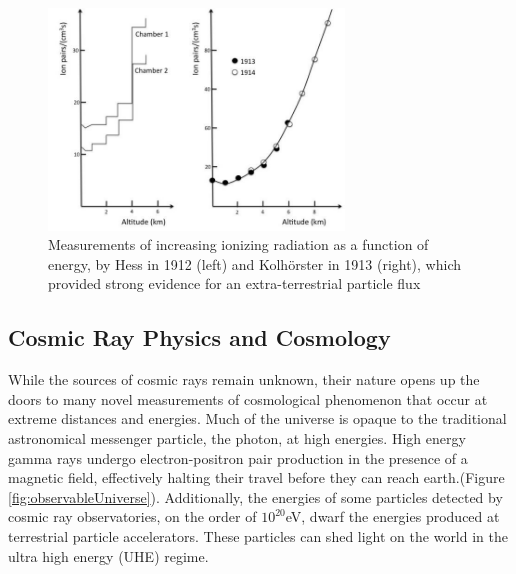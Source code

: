 \begin{figure}
\centering
	\includegraphics[width=0.7\textwidth]{figures/HessKol}
	\caption{Measurements of increasing ionizing radiation as a function of energy, by Hess in 1912 (left) and Kolhörster in 1913 (right), which provided strong evidence for an extra-terrestrial particle flux
	\cite{HessKolPic} }
\label{fig:HessKol}
\end{figure}
	
	\subsection{Cosmic Ray Physics and Cosmology}
	While the sources of cosmic rays remain unknown, their nature opens up the doors to many novel measurements of cosmological phenomenon that occur at extreme distances and energies.  Much of the universe is opaque to the traditional astronomical messenger particle, the photon, at high energies.  High energy gamma rays undergo electron-positron pair production in the presence of a magnetic field, effectively halting their travel before they can reach earth.(Figure \ref{fig:observableUniverse})\cite{RevModPhys.41.581}.  Additionally, the energies of some particles detected by cosmic ray observatories, on the order of $10^20$eV, dwarf the energies produced at terrestrial particle accelerators.  These particles can shed light on the world in the ultra high energy (UHE) regime.

